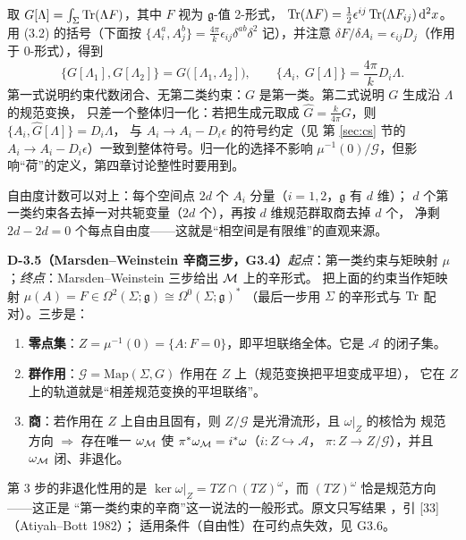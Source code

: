 \begin{derivation}[D-3.4：约束代数与生成元]
取 $G[\Lambda]=\int_\Sigma\operatorname{Tr}(\Lambda F)$，其中 $F$ 视为 $\mathfrak g$-值 2-形式，
$\operatorname{Tr}(\Lambda F)=\tfrac12\epsilon^{ij}\operatorname{Tr}(\Lambda F_{ij})\,\mathrm{d}^2x$。用 (3.2) 的括号（下面按
$\{A_i^a,A_j^b\}=\frac{4\pi}{k}\epsilon_{ij}\delta^{ab}\delta^2$ 记），并注意
$\delta F/\delta A_i=\epsilon_{ij}D_j$（作用于 0-形式），得到
\begin{equation}
\{G[\Lambda_1],G[\Lambda_2]\}=G\bigl([\Lambda_1,\Lambda_2]\bigr),\qquad
\{A_i,\;G[\Lambda]\}=\frac{4\pi}{k}D_i\Lambda .
\end{equation}
第一式说明约束代数闭合、无第二类约束：$G$ 是第一类。第二式说明 $G$ 生成沿 $\Lambda$ 的规范变换，
只差一个整体归一化：若把生成元取成 $\hat G=\frac{k}{4\pi}G$，则 $\{A_i,\hat G[\Lambda]\}=D_i\Lambda$，
与 $A_i\to A_i-D_i\epsilon$ 的符号约定（见 第 \ref{sec:cs} 节的 $A_i\to A_i-D_i\epsilon$）一致到整体符号。归一化的选择不影响
$\mu^{-1}(0)/\mathcal G$，但影响“荷”的定义，第四章讨论整性时要用到。
\end{derivation}

自由度计数可以对上：每个空间点 $2d$ 个 $A_i$ 分量（$i=1,2$，$\mathfrak g$ 有 $d$ 维）；
$d$ 个第一类约束各去掉一对共轭变量（$2d$ 个），再按 $d$ 维规范群取商去掉 $d$ 个，
净剩 $2d-2d=0$ 个每点自由度——这就是“相空间是有限维”的直观来源。

\noindent\textbf{D-3.5（Marsden--Weinstein 辛商三步，G3.4）}\quad\emph{起点}：第一类约束与矩映射 $\mu$；\emph{终点}：Marsden--Weinstein 三步给出 $\mathcal{M}$ 上的辛形式。
把上面的约束当作矩映射 $\mu(A)=F\in\Omega^2(\Sigma;\mathfrak g)\cong\Omega^0(\Sigma;\mathfrak g)^*$
（最后一步用 $\Sigma$ 的辛形式与 $\operatorname{Tr}$ 配对）。三步是：

\begin{enumerate}[leftmargin=2.4em]
\item \textbf{零点集}：$Z=\mu^{-1}(0)=\{A:F=0\}$，即平坦联络全体。它是 $\mathcal A$ 的闭子集。
\item \textbf{群作用}：$\mathcal G=\mathrm{Map}(\Sigma,G)$ 作用在 $Z$ 上（规范变换把平坦变成平坦），
它在 $Z$ 上的轨道就是“相差规范变换的平坦联络”。
\item \textbf{商}：若作用在 $Z$ 上自由且固有，则 $Z/\mathcal G$ 是光滑流形，且 $\omega|_Z$ 的核恰为
规范方向 $\Rightarrow$ 存在唯一 $\omega_{\mathcal{M}}$ 使 $\pi^*\omega_{\mathcal{M}}=i^*\omega$（$i:Z\hookrightarrow\mathcal A$，
$\pi:Z\to Z/\mathcal G$），并且 $\omega_{\mathcal{M}}$ 闭、非退化。
\end{enumerate}
第 3 步的非退化性用的是 $\ker\omega|_Z=TZ\cap(TZ)^\omega$，而 $(TZ)^\omega$ 恰是规范方向——这正是
“第一类约束的辛商”这一说法的一般形式。原文只写结果 ，引 [33]（Atiyah--Bott 1982）；
适用条件（自由性）在可约点失效，见 G3.6。

